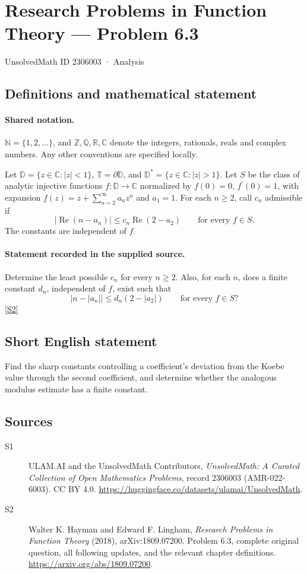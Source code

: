 \documentclass[11pt]{book}
\newcommand{\sref}[2]{\hyperlink{source:#1:#2}{[S#2]}}
\begin{document}
\setcounter{section}{2306002}
\section{Research Problems in Function Theory — Problem 6.3}\label{2306003}
{\small\sffamily UnsolvedMath ID 2306003 · Analysis}
\subsection{Definitions and mathematical statement}

\paragraph{Shared notation.}$\mathbb N=\{1,2,\ldots\}$, and $\mathbb Z,\mathbb Q,\mathbb R,\mathbb C$ denote the integers, rationals, reals and complex numbers. Any other conventions are specified locally.


Let $\mathbb D=\{z\in\mathbb C:|z|<1\}$, $\mathbb T=\partial\mathbb D$, and $\mathbb D^*=\{z\in\mathbb C:|z|>1\}$. Let $S$ be the class of analytic injective functions $f:\mathbb D\to\mathbb C$ normalized by $f(0)=0$, $f^{\prime}(0)=1$, with expansion $f(z)=z+\sum_{n=2}^{\infty}a_nz^n$ and $a_1=1$. For each $n\ge2$, call $c_n$ admissible if \[|\operatorname{Re}(n-a_n)|\le c_n\operatorname{Re}(2-a_2)\qquad\text{for every }f\in S.\] The constants are independent of $f$.
\paragraph{Statement recorded in the supplied source.}
Determine the least possible $c_n$ for every $n\ge2$. Also, for each $n$, does a finite constant $d_n$, independent of $f$, exist such that \[\big|n-|a_n|\big|\le d_n(2-|a_2|)\qquad\text{for every }f\in S?\] \sref{2306003}{2}
\subsection{Short English statement}
Find the sharp constants controlling a coefficient’s deviation from the Koebe value through the second coefficient, and determine whether the analogous modulus estimate has a finite constant.
\subsection{Sources}
\begin{description}
\item[\hypertarget{source:2306003:1}{S1}] ULAM.AI and the UnsolvedMath Contributors, \emph{UnsolvedMath: A Curated Collection of Open Mathematics Problems}, record 2306003 (AMR-022-6003). CC BY 4.0. \url{https://huggingface.co/datasets/ulamai/UnsolvedMath}.
\item[\hypertarget{source:2306003:2}{S2}] Walter K. Hayman and Edward F. Lingham, \emph{Research Problems in Function Theory} (2018), arXiv:1809.07200. Problem 6.3, complete original question, all following updates, and the relevant chapter definitions. \url{https://arxiv.org/abs/1809.07200}.
\end{description}
\label{end:2306003}
\end{document}
